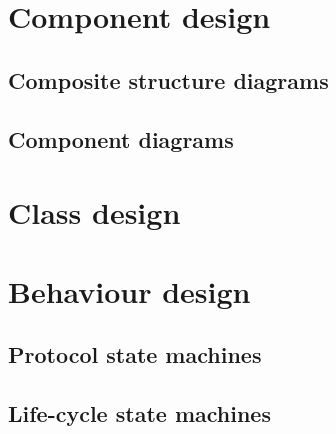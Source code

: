 \section{Component design}


\subsection{Composite structure diagrams}


\subsection{Component diagrams}





\section{Class design}



\section{Behaviour design}
\subsection{Protocol state machines}


\subsection{Life-cycle state machines}
